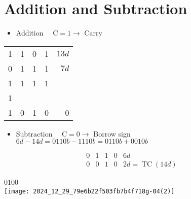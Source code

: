 \section*{Addition and Subtraction}
\begin{itemize}
  \item Addition $\quad \mathrm{C}=1 \rightarrow$ Carry
\end{itemize}

\begin{center}
\begin{tabular}{|rrrrr|}
\hline
1 & 1 & 0 & 1 & $13 d$ \\
0 & 1 & 1 & 1 & $7 d$ \\
1 & 1 & 1 & 1 &  \\
1 &  &  &  &  \\
1 & 0 & 1 & 0 & 0 \\
\end{tabular}
\end{center}

\begin{itemize}
  \item Subtraction $\quad \mathrm{C}=0 \rightarrow$ Borrow sign\\
$6 d-14 d=0110 b-1110 b=0110 b+0010 b$
\end{itemize}

$$
\begin{array}{llllll}
0 & 1 & 1 & 0 & 6 d \\
0 & 0 & 1 & 0 & 2 d=\operatorname{TC}(14 d)
\end{array}
$$

0100\\
\texttt{[image: 2024\_12\_29\_79e6b22f503fb7b4f718g-04(2)]}
